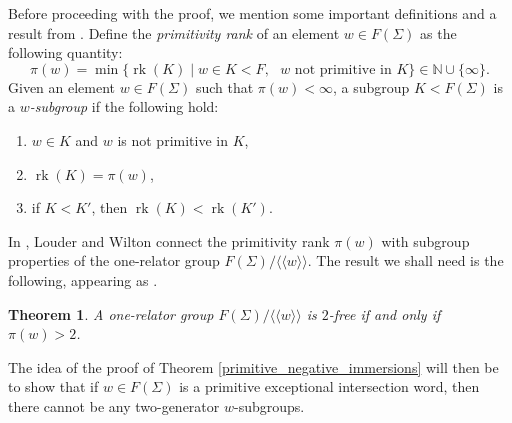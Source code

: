 \documentclass[11pt, a4paper]{amsart}
\newtheorem{theorem}{Theorem}[section]
\theoremstyle{definition}
\newcommand{\N}{\mathbb{N}}
\newcommand{\normal}[1]{\langle\langle #1 \rangle\rangle}
\DeclareMathOperator{\rk}{rk}
\begin{document}
Before proceeding with the proof, we mention some important definitions and a result from \cite{louder_21}. Define the \emph{primitivity rank} of an element $w\in F(\Sigma)$ as the following quantity:
\[
\pi(w) = \min{\{\rk(K) \mid w\in K<F, \text{ $w$ not primitive in $K$}\}}\in \N\cup \{\infty\}.
\]
Given an element $w\in F(\Sigma)$ such that $\pi(w)<\infty$, a subgroup $K<F(\Sigma)$ is a \emph{$w$-subgroup} if the following hold:
\begin{enumerate}
\item $w\in K$ and $w$ is not primitive in $K$,
\item $\rk(K) = \pi(w)$,
\item if $K<K'$, then $\rk(K)<\rk(K')$.
\end{enumerate}

In \cite{louder_21}, Louder and Wilton connect the primitivity rank $\pi(w)$ with subgroup properties of the one-relator group $F(\Sigma)/\normal{w}$. The result we shall need is the following, appearing as \cite[Theorem 1.5]{louder_21}.

\begin{theorem}
\label{lw_2_free}
A one-relator group $F(\Sigma)/\normal{w}$ is $2$-free if and only if $\pi(w)>2$. 
\end{theorem}

The idea of the proof of Theorem \ref{primitive_negative_immersions} will then be to show that if $w\in F(\Sigma)$ is a primitive exceptional intersection word, then there cannot be any two-generator $w$-subgroups.
\end{document}
